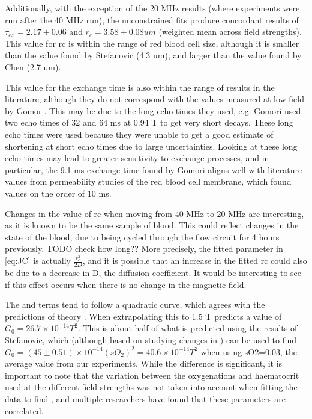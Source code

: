 Additionally, with the exception of the 20 MHz results (where experiments were run after the 40 MHz run), the unconstrained fits produce concordant results of $\tau_{ex} = 2.17 \pm 0.06$ and $r_c = 3.58 \pm 0.08 um$ (weighted mean across field strengths).
This value for rc is within the range of red blood cell size, although it is smaller than the value found by Stefanovic (4.3 um)\cite{StefanovicHumanwholebloodrelaxometry2004}, and larger than the value found by Chen (2.7 um)\cite{ChenHumanwholeblood2009}.

This value for the exchange time is also within the range of results in the literature, although they do not correspond with the values measured at low field by Gomori\cite{GomoriNMRRelaxationTimes1987}.
This may be due to the long echo times they used, e.g. Gomori used two echo times of 32 and 64 ms at 0.94 T to get very short \Ttwo decays.
These long echo times were used because they were unable to get a good estimate of \Ttwo shortening at short echo times due to large uncertainties.
Looking at these long echo times may lead to greater sensitivity to exchange processes, and in particular, the 9.1 ms exchange time found by Gomori aligns well with literature values from permeability studies of the red blood cell membrane, which found values on the order of 10 ms.

Changes in the value of rc when moving from 40 MHz to 20 MHz are interesting, as it is known to be the same sample of blood.
This could reflect changes in the state of the blood, due to being cycled through the flow circuit for 4 hours previously. TODO check how long??
More precisely, the fitted parameter in \autoref{eq:JC} is actually $\frac{r_c^2}{2D}$, and it is possible that an increase in the fitted rc could also be due to a decrease in D, the diffusion coefficient.
It would be interesting to see if this effect occurs when there is no change in the magnetic field.

The \Kzero and \Gzero terms tend to follow a quadratic curve, which agrees with the predictions of theory \cite[Eq. 52-54]{JensenNMRrelaxationtissues2000}.
When extrapolating this to 1.5 T predicts a value of $G_0 = 26.7 \times 10^{-14}  T^2$.
This is about half of what is predicted using the results of Stefanovic, which (although based on studying changes in \SOtwo) can be used to find $G_0 = (45\pm0.51) \times 10^{-14} (sO_2)^2 = 40.6 \times 10^{-14}  T^2$ when using sO2=0.03, the average value from our experiments.
While the difference is significant, it is important to note that the variation between the oxygenations and haematocrit used at the different field strengths was not taken into account when fitting the data to find \Gzero, and multiple researchers \cite{StefanovicHumanwholebloodrelaxometry2004,ChenHumanwholeblood2009,GardenerDependencebloodR22010} have found that these parameters are correlated.

